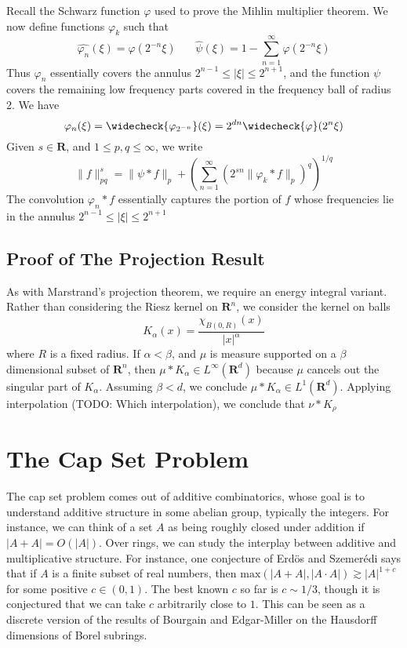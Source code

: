 Recall the Schwarz function $\varphi$ used to prove the Mihlin multiplier theorem. We now define functions $\varphi_k$ such that
%
\[ \widehat{\varphi_n}(\xi) = \varphi(2^{-n} \xi)\ \ \ \ \ \ \ \ \widehat{\psi}(\xi) = 1 - \sum_{n = 1}^\infty \varphi(2^{-n} \xi) \]
%
Thus $\varphi_n$ essentially covers the annulus $2^{n-1} \leq |\xi| \leq 2^{n+1}$, and the function $\psi$ covers the remaining low frequency parts covered in the frequency ball of radius 2. We have
%
\[ \varphi_n(\xi) = \widecheck{\varphi_{2^{-n}}}(\xi) = 2^{dn} \widecheck{\varphi}(2^n \xi) \]
%
Given $s \in \mathbf{R}$, and $1 \leq p, q \leq \infty$, we write
%
\[ \| f \|_{pq}^s = \| \psi * f \|_p + \left( \sum_{n = 1}^\infty (2^{sn} \| \varphi_k * f \|_p)^q \right)^{1/q} \]
%
The convolution $\varphi_n * f$ essentially captures the portion of $f$ whose frequencies lie in the annulus $2^{n-1} \leq |\xi| \leq 2^{n+1}$

\section{Proof of The Projection Result}

As with Marstrand's projection theorem, we require an energy integral variant. Rather than considering the Riesz kernel on $\mathbf{R}^n$, we consider the kernel on balls
%
\[ K_\alpha(x) = \frac{\chi_{B(0,R)}(x)}{|x|^\alpha} \]
%
where $R$ is a fixed radius. If $\alpha < \beta$, and $\mu$ is measure supported on a $\beta$ dimensional subset of $\mathbf{R}^n$, then $\mu * K_\alpha \in L^\infty(\mathbf{R}^d)$ because $\mu$ cancels out the singular part of $K_\alpha$. Assuming $\beta < d$, we conclude $\mu * K_\alpha \in L^1(\mathbf{R}^d)$. Applying interpolation (TODO: Which interpolation), we conclude that $\nu * K_\rho$ 

\chapter{The Cap Set Problem}

The cap set problem comes out of additive combinatorics, whose goal is to understand additive structure in some abelian group, typically the integers. For instance, we can think of a set $A$  as being roughly closed under addition if $|A+A| = O(|A|)$. Over rings, we can study the interplay between additive and multiplicative structure. For instance, one conjecture of Erd\"{o}s and Szemer\'{e}di says that if $A$ is a finite subset of real numbers, then $\text{max}(|A+A|,|A \cdot A|) \gtrsim |A|^{1+c}$ for some positive $c \in (0,1)$. The best known $c$ so far is $c \sim 1/3$, though it is conjectured that we can take $c$ arbitrarily close to $1$. This can be seen as a discrete version of the results of Bourgain and Edgar-Miller on the Hausdorff dimensions of Borel subrings.

